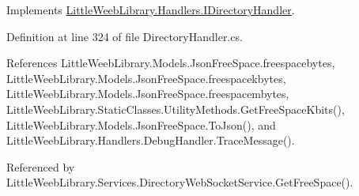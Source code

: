 Implements \mbox{\hyperlink{interface_little_weeb_library_1_1_handlers_1_1_i_directory_handler_aa969b0771c2482aa5b3fed0d5b9fae65}{Little\+Weeb\+Library.\+Handlers.\+I\+Directory\+Handler}}.



Definition at line 324 of file Directory\+Handler.\+cs.



References Little\+Weeb\+Library.\+Models.\+Json\+Free\+Space.\+freespacebytes, Little\+Weeb\+Library.\+Models.\+Json\+Free\+Space.\+freespacekbytes, Little\+Weeb\+Library.\+Models.\+Json\+Free\+Space.\+freespacembytes, Little\+Weeb\+Library.\+Static\+Classes.\+Utility\+Methods.\+Get\+Free\+Space\+Kbits(), Little\+Weeb\+Library.\+Models.\+Json\+Free\+Space.\+To\+Json(), and Little\+Weeb\+Library.\+Handlers.\+Debug\+Handler.\+Trace\+Message().



Referenced by Little\+Weeb\+Library.\+Services.\+Directory\+Web\+Socket\+Service.\+Get\+Free\+Space().


